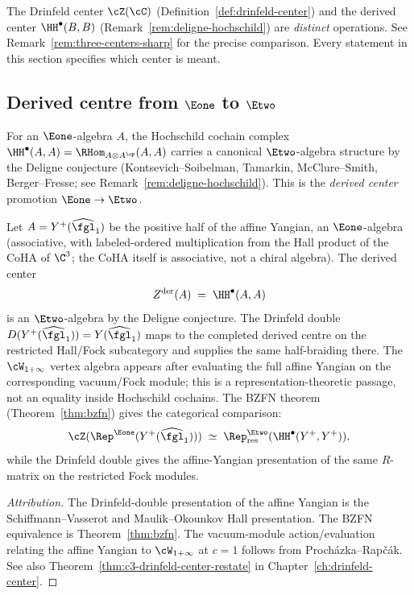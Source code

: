 \begin{remark}
\label{rem:higher-deligne-three-centers}
The Drinfeld center $\cZ(\cC)$ (Definition~\ref{def:drinfeld-center}) and the derived center $\HH^\bullet(B,B)$ (Remark~\ref{rem:deligne-hochschild}) are \emph{distinct} operations. See Remark~\ref{rem:three-centers-sharp} for the precise comparison. Every statement in this section specifies which center is meant.
\end{remark}


\subsection{Derived centre from \texorpdfstring{$\Eone$}{E1} to \texorpdfstring{$\Etwo$}{E2}}
\label{subsec:step1-e1-to-e2}

For an $\Eone$-algebra $A$, the Hochschild cochain complex $\HH^\bullet(A, A) = \RHom_{A \otimes A^{\op}}(A, A)$ carries a canonical $\Etwo$-algebra structure by the Deligne conjecture (Kontsevich--Soibelman, Tamarkin, McClure--Smith, Berger--Fresse; see Remark~\ref{rem:deligne-hochschild}). This is the \emph{derived center} promotion $\Eone \to \Etwo$.

\begin{proposition}
\label{prop:higher-deligne-step1}
Let $A = Y^+(\widehat{\fgl}_1)$ be the positive half of the affine Yangian, an $\Eone$-algebra (associative, with labeled-ordered multiplication from the Hall product of the CoHA of $\C^3$; the CoHA itself is associative, not a chiral algebra). The derived center
\[
 Z^{\mathrm{der}}(A) \;=\; \HH^\bullet(A, A)
\]
is an \(\Etwo\)-algebra by the Deligne conjecture. The Drinfeld double
\(D(Y^+(\widehat{\fgl}_1))=Y(\widehat{\fgl}_1)\) maps to the completed
derived centre on the restricted Hall/Fock subcategory and supplies the
same half-braiding there. The $\cW_{1+\infty}$ vertex algebra appears
after evaluating the full affine Yangian on the corresponding
vacuum/Fock module; this is a representation-theoretic passage, not an
equality inside Hochschild cochains. The BZFN theorem
(Theorem~\ref{thm:bzfn}) gives the categorical comparison:
\[
 \cZ(\Rep^{\Eone}(Y^+(\widehat{\fgl}_1)))
 \;\simeq\;
 \Rep^{\Etwo}_{\mathrm{res}}(\HH^\bullet(Y^+, Y^+)),
\]
while the Drinfeld double gives the affine-Yangian presentation of the
same \(R\)-matrix on the restricted Fock modules.
\end{proposition}

\begin{proof}[Attribution]
The Drinfeld-double presentation of the affine Yangian is the
Schiffmann--Vasserot and Maulik--Okounkov Hall presentation. The BZFN
equivalence is Theorem~\ref{thm:bzfn}. The vacuum-module
action/evaluation relating the affine Yangian to $\cW_{1+\infty}$ at
$c = 1$ follows from Proch\'azka--Rap\v{c}\'ak. See also
Theorem~\ref{thm:c3-drinfeld-center-restate} in
Chapter~\ref{ch:drinfeld-center}.
\end{proof}


